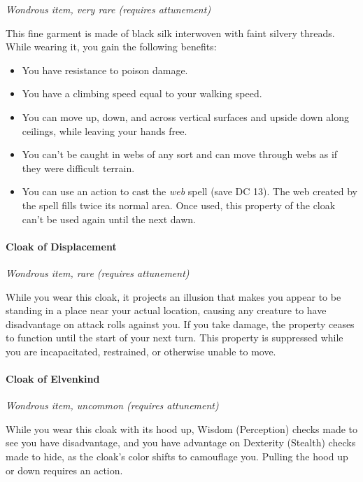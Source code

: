 \documentclass[
]{article}
\providecommand{\tightlist}{%
  \setlength{\itemsep}{0pt}\setlength{\parskip}{0pt}}
\begin{document}
\emph{Wondrous item, very rare (requires attunement)}

This fine garment is made of black silk interwoven with faint silvery
threads. While wearing it, you gain the following benefits:

\begin{itemize}
\tightlist
\item
  You have resistance to poison damage.
\item
  You have a climbing speed equal to your walking speed.
\item
  You can move up, down, and across vertical surfaces and upside down
  along ceilings, while leaving your hands free.
\item
  You can't be caught in webs of any sort and can move through webs as
  if they were difficult terrain.
\item
  You can use an action to cast the \emph{web} spell (save DC 13). The
  web created by the spell fills twice its normal area. Once used, this
  property of the cloak can't be used again until the next dawn.
\end{itemize}

\hypertarget{cloak-of-displacement}{%
\paragraph{Cloak of Displacement}\label{cloak-of-displacement}}

\emph{Wondrous item, rare (requires attunement)}

While you wear this cloak, it projects an illusion that makes you appear
to be standing in a place near your actual location, causing any
creature to have disadvantage on attack rolls against you. If you take
damage, the property ceases to function until the start of your next
turn. This property is suppressed while you are incapacitated,
restrained, or otherwise unable to move.

\hypertarget{cloak-of-elvenkind}{%
\paragraph{Cloak of Elvenkind}\label{cloak-of-elvenkind}}

\emph{Wondrous item, uncommon (requires attunement)}

While you wear this cloak with its hood up, Wisdom (Perception) checks
made to see you have disadvantage, and you have advantage on Dexterity
(Stealth) checks made to hide, as the cloak's color shifts to camouflage
you. Pulling the hood up or down requires an action.
\end{document}
